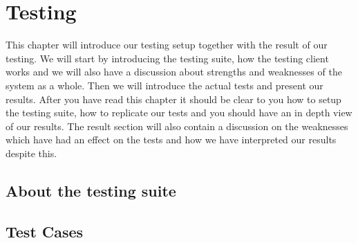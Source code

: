 \section{Testing}\label{Testing}
	This chapter will introduce our testing setup together with the result of our testing. We will start by introducing the testing suite, how the testing client works and we will also have a discussion about strengths and weaknesses of the system as a whole. Then we will introduce the actual tests and present our results. After you have read this chapter it should be clear to you how to setup the testing suite, how to replicate our tests and you should have an in depth view of our results. The result section will also contain a discussion on the weaknesses which have had an effect on the tests and how we have interpreted our results despite this.
    
    
    \subsection{About the testing suite}\label{Testing:About}
 		
    	
	\subsection{Test Cases}\label{Testing:Cases}
		
